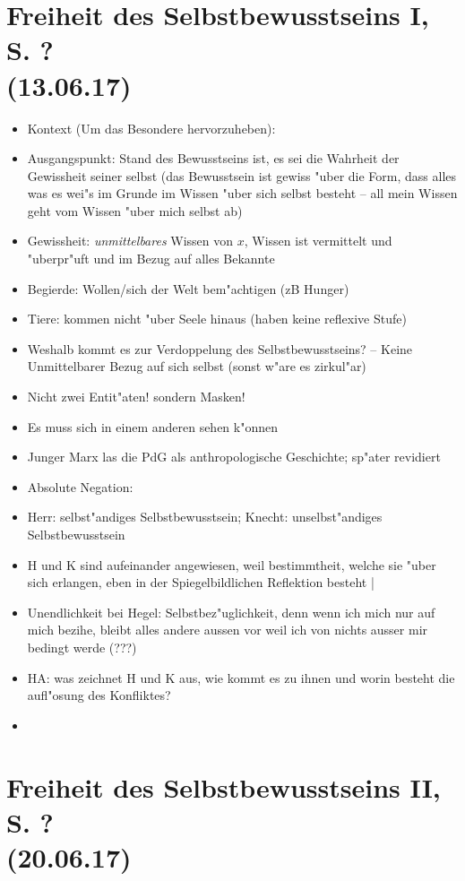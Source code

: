 \documentclass[emulatestandardclasses]{scrartcl}
\begin{document}
\section{Freiheit des Selbstbewusstseins I, S. ?\\(13.06.17)}

\begin{itemize}
  \item Kontext (Um das Besondere hervorzuheben): 
  \item Ausgangspunkt: Stand des Bewusstseins ist, es sei die Wahrheit der Gewissheit seiner selbst (das Bewusstsein ist gewiss "uber die Form, dass alles was es wei"s im Grunde im Wissen "uber sich selbst besteht -- all mein Wissen geht vom Wissen "uber mich selbst ab)
  \item Gewissheit: \emph{unmittelbares} Wissen von $x$, Wissen ist vermittelt und "uberpr"uft und im Bezug auf alles Bekannte
  \item Begierde: Wollen/sich der Welt bem"achtigen (zB Hunger)
  \item Tiere: kommen nicht "uber Seele hinaus (haben keine reflexive Stufe)
  \item Weshalb kommt es zur Verdoppelung des Selbstbewusstseins? -- Keine Unmittelbarer Bezug auf sich selbst (sonst w"are es zirkul"ar)
  \item Nicht zwei Entit"aten! sondern Masken!
  \item Es muss sich in einem anderen sehen k"onnen
  \item Junger Marx las die PdG als anthropologische Geschichte; sp"ater revidiert
  \item Absolute Negation: 
  \item Herr: selbst"andiges Selbstbewusstsein; Knecht: unselbst"andiges Selbstbewusstsein
  \item H und K sind aufeinander angewiesen, weil bestimmtheit, welche sie "uber sich erlangen, eben in der Spiegelbildlichen Reflektion besteht | 
  \item Unendlichkeit bei Hegel: Selbstbez"uglichkeit, denn wenn ich mich nur auf mich bezihe, bleibt alles andere aussen vor weil ich von nichts ausser mir bedingt werde (???)
  \item HA: was zeichnet H und K aus, wie kommt es zu ihnen und worin besteht die aufl"osung des Konfliktes?
  \item 
\end{itemize}

\section{Freiheit des Selbstbewusstseins II, S. ?\\(20.06.17)}
\end{document}

